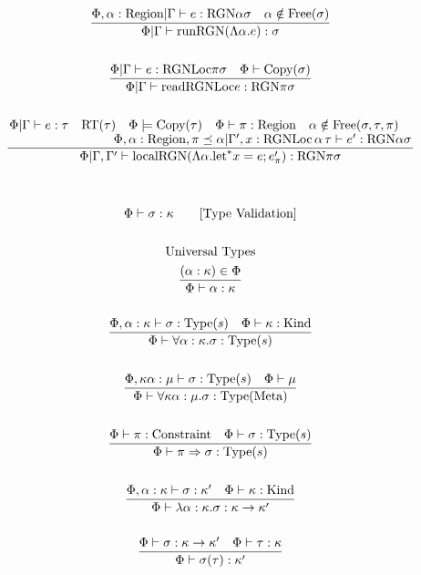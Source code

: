 \documentclass {article}
\begin{document}
\begin{gather*}
\\
\frac
{\Phi, \alpha : \text{Region}| \Gamma \vdash e : \text{RGN} \alpha \sigma \quad \alpha \notin \text{Free}(\sigma)}
{\Phi | \Gamma \vdash \text{runRGN} (\Lambda \alpha. e) : \sigma}\\
\\
\frac
{\Phi | \Gamma \vdash e : \text{RGNLoc} \pi \sigma \quad \Phi \vdash \text{Copy} (\sigma) }
{\Phi | \Gamma \vdash \text{readRGNLoc} e : \text{RGN} \pi \sigma} \\
\\
\frac
{\splitfrac{\Phi | \Gamma \vdash e : \tau \quad \text{RT} (\tau) \quad \Phi \models \text{Copy} (\tau) \quad \Phi \vdash \pi : \text{Region} \quad \alpha \notin \text{Free}(\sigma, \tau, \pi)}
{\Phi, \alpha : \text{Region} , \pi \preceq \alpha | \Gamma', x : \text{RGNLoc} \, \alpha \, \tau \vdash e' : \text{RGN} \alpha \sigma}}
{\Phi | \Gamma, \Gamma' \vdash \text{localRGN} (\Lambda \alpha. \text{let}^* x = e; e'_\pi ) : \text{RGN} \pi \sigma}
\\
\\
\\
\Phi \vdash \sigma : \kappa \tag* {[\text{Type Validation}]} \\
\\
\text{Universal Types}
\\
\frac
{(\alpha : \kappa) \in \Phi}
{\Phi \vdash \alpha : \kappa} \\
\\
\frac
{\Phi, \alpha : \kappa \vdash \sigma : \text{Type}(s) \quad \Phi \vdash \kappa : \text{Kind}}
{\Phi \vdash \forall \alpha : \kappa. \sigma : \text{Type} (s) } \\
\\
\frac
{\Phi, \kappa \alpha : \mu \vdash \sigma : \text{Type} (s) \quad \Phi \vdash \mu  }
{\Phi \vdash \forall \kappa \alpha : \mu. \sigma : \text{Type} (\text{Meta}) } \\
\\
\frac
{\Phi \vdash \pi : \text{Constraint} \quad \Phi \vdash \sigma : \text{Type}(s)}
{\Phi \vdash \pi \Rightarrow \sigma : \text{Type}(s)} \\
\\
\frac
{\Phi, \alpha : \kappa \vdash \sigma : \kappa' \quad \Phi \vdash \kappa : \text{Kind}} 
{\Phi \vdash \lambda \alpha : \kappa. \sigma : \kappa \to \kappa' } \\
\\
\frac
{\Phi \vdash \sigma : \kappa \to \kappa' \quad \Phi \vdash \tau : \kappa}
{\Phi \vdash \sigma (\tau) : \kappa' } \\

\end{gather*}
\end{document}
